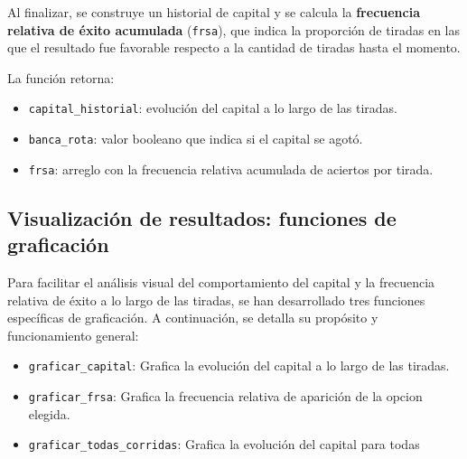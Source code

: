 \documentclass{article}
\begin{document}
Al finalizar, se construye un historial de capital y se calcula la \textbf{frecuencia relativa de éxito acumulada} (\texttt{frsa}), que indica la proporción de tiradas en las que el resultado fue favorable respecto a la cantidad de tiradas hasta el momento.

\noindent La función retorna:
\begin{itemize}
    \item \texttt{capital\_historial}: evolución del capital a lo largo de las tiradas.
    \item \texttt{banca\_rota}: valor booleano que indica si el capital se agotó.
    \item \texttt{frsa}: arreglo con la frecuencia relativa acumulada de aciertos por tirada.
\end{itemize}

\subsection*{Visualización de resultados: funciones de graficación}
Para facilitar el análisis visual del comportamiento del capital y la frecuencia relativa de éxito a lo largo de las tiradas, se han desarrollado tres funciones específicas de graficación. A continuación, se detalla su propósito y funcionamiento general:

\begin{itemize}
    \item \texttt{graficar\_capital}: Grafica la evolución del capital a lo largo de las tiradas.
    \item \texttt{graficar\_frsa}: Grafica la frecuencia relativa de aparición de la opcion elegida.
    \item \texttt{graficar\_todas\_corridas}: Grafica la evolución del capital para todas
\end{itemize}
\end{document}
